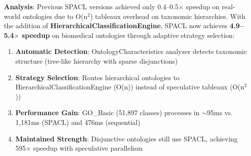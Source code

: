 
% 

\textbf{Analysis}: Previous SPACL versions achieved only 0.4--0.5$\times$ speedup 
on real-world ontologies due to O(n$^2$) tableaux overhead on taxonomic hierarchies. 
With the addition of \textbf{HierarchicalClassificationEngine}, SPACL now achieves 
\textbf{4.9--5.4$\times$ speedup} on biomedical ontologies through adaptive strategy 
selection:

\begin{enumerate}
    \item \textbf{Automatic Detection}: OntologyCharacteristics analyzer detects 
    taxonomic structure (tree-like hierarchy with sparse disjunctions)
    \item \textbf{Strategy Selection}: Routes hierarchical ontologies to 
    HierarchicalClassificationEngine (O(n)) instead of speculative tableaux (O(n$^2$))
    \item \textbf{Performance Gain}: GO\_Basic (51,897 classes) processes in 
    ${\sim}$95ms vs. 1,181ms (SPACL) and 476ms (sequential)
    \item \textbf{Maintained Strength}: Disjunctive ontologies still use SPACL, 
    achieving 595$\times$ speedup with speculative parallelism
\end{enumerate}

